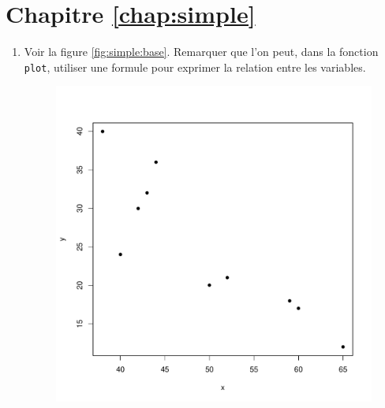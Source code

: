 \section*{Chapitre \ref{chap:simple}}

\begin{solution}{2.1}
    \begin{enumerate}
    \item Voir la figure \ref{fig:simple:base}. Remarquer que l'on
      peut, dans la fonction \texttt{plot}, utiliser une formule pour
      exprimer la relation entre les variables.
      \begin{figure}
        \centering
\begin{knitrout}
\color{fgcolor}\begin{kframe}
\begin{alltt}
\hlkwb{<-}\hlstd{(}\hlstd{,} \hlstd{,} \hlstd{,} \hlstd{,} \hlstd{,} \hlstd{,} \hlstd{,} \hlstd{,} \hlstd{,} \hlstd{)}
\hlkwb{<-}\hlstd{(}\hlstd{,} \hlstd{,} \hlstd{,} \hlstd{,} \hlstd{,} \hlstd{,} \hlstd{,} \hlstd{,} \hlstd{,} \hlstd{)}
 \hlopt{~}   \hlstd{=} \hlstd{)}
\end{alltt}
\end{kframe}
\includegraphics[width=\maxwidth]{figure/unnamed-chunk-8-1}


\end{knitrout}
\end{figure}
\end{enumerate}
\end{solution}

